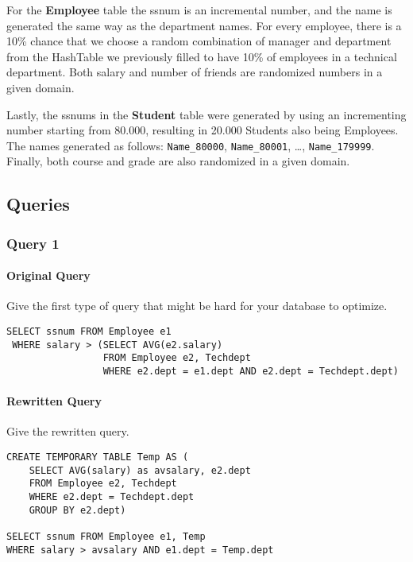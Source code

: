 \documentclass[11pt]{scrartcl}
\begin{document}
    For the \textbf{Employee} table the ssnum is an incremental number, and the name is generated the same way as the department names.
    For every employee, there is a 10\% chance that we choose a random combination of manager and department from the HashTable we previously filled to have 10\% of employees in a technical department.
    Both salary and number of friends are randomized numbers in a given domain.

    Lastly, the ssnums in the \textbf{Student} table were generated by using an incrementing number starting from 80.000, resulting in 20.000 Students also being Employees.
    The names generated as follows: \texttt{Name\_80000}, \texttt{Name\_80001}, \dots , \texttt{Name\_179999}.
    Finally, both course and grade are also randomized in a given domain.
    

    
    \subsection*{Queries}

    \subsubsection*{Query 1}

    \paragraph{Original Query}

    Give the first type of query that might be hard for your database to optimize.

    \begin{lstlisting}[style=dbtsql]
 SELECT ssnum FROM Employee e1 
 WHERE salary > (SELECT AVG(e2.salary) 
                 FROM Employee e2, Techdept 
                 WHERE e2.dept = e1.dept AND e2.dept = Techdept.dept)
    \end{lstlisting}

    \paragraph{Rewritten Query}

    Give the rewritten query.

    \begin{lstlisting}[style=dbtsql]
CREATE TEMPORARY TABLE Temp AS (
    SELECT AVG(salary) as avsalary, e2.dept 
    FROM Employee e2, Techdept 
    WHERE e2.dept = Techdept.dept 
    GROUP BY e2.dept)

SELECT ssnum FROM Employee e1, Temp 
WHERE salary > avsalary AND e1.dept = Temp.dept
    \end{lstlisting}
\end{document}
